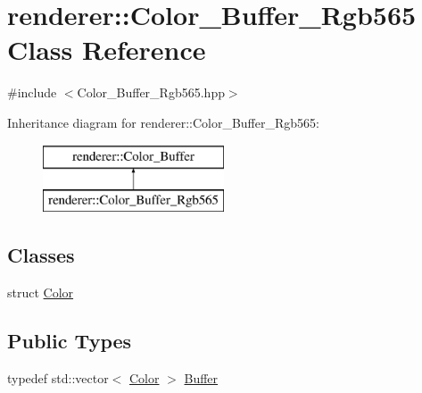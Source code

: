 \hypertarget{classrenderer_1_1_color___buffer___rgb565}{}\section{renderer\+::Color\+\_\+\+Buffer\+\_\+\+Rgb565 Class Reference}
\label{classrenderer_1_1_color___buffer___rgb565}


{\ttfamily \#include $<$Color\+\_\+\+Buffer\+\_\+\+Rgb565.\+hpp$>$}

Inheritance diagram for renderer\+::Color\+\_\+\+Buffer\+\_\+\+Rgb565\+:\begin{figure}[H]
\begin{center}
\leavevmode
\includegraphics[height=2.000000cm]{classrenderer_1_1_color___buffer___rgb565}
\end{center}
\end{figure}
\subsection*{Classes}
\begin{DoxyCompactItemize}
\item 
struct \mbox{\hyperlink{structrenderer_1_1_color___buffer___rgb565_1_1_color}{Color}}
\end{DoxyCompactItemize}
\subsection*{Public Types}
\begin{DoxyCompactItemize}
\item 
typedef std\+::vector$<$ \mbox{\hyperlink{structrenderer_1_1_color___buffer___rgb565_1_1_color}{Color}} $>$ \mbox{\hyperlink{classrenderer_1_1_color___buffer___rgb565_a60feae2b617049e32ecfb9e87349272c}{Buffer}}
\end{DoxyCompactItemize}

